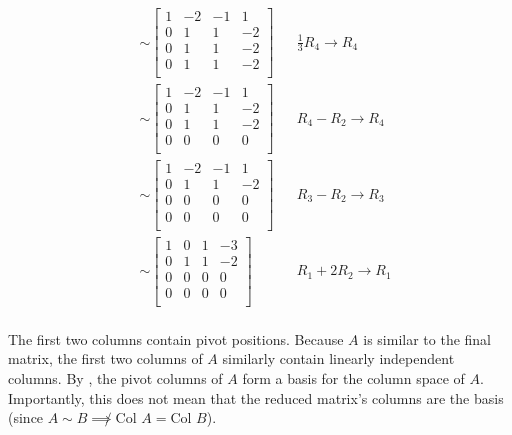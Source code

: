 \documentclass[10pt,letterpaper,final]{report}
\newcommand{\reason}[1]{&& \text{#1}}
\begin{document}
\begin{enumerate}[label=(\alph*)]
\begin{align*}
            & \sim \begin{bmatrix}
                     1 & -2 & -1 & 1  \\
                     0 & 1  & 1  & -2 \\
                     0 & 1  & 1  & -2 \\
                     0 & 1  & 1  & -2 \\
                   \end{bmatrix} \reason{$\frac{1}{3}R_4 \to R_4$}                 \\[1ex]
            & \sim \begin{bmatrix}
                     1 & -2 & -1 & 1  \\
                     0 & 1  & 1  & -2 \\
                     0 & 1  & 1  & -2 \\
                     0 & 0  & 0  & 0  \\
                   \end{bmatrix} \reason{$R_4 - R_2 \to R_4$}                      \\[1ex]
            & \sim \begin{bmatrix}
                     1 & -2 & -1 & 1  \\
                     0 & 1  & 1  & -2 \\
                     0 & 0  & 0  & 0  \\
                     0 & 0  & 0  & 0  \\
                   \end{bmatrix} \reason{$R_3 - R_2 \to R_3$}                      \\[1ex]
            & \sim \begin{bmatrix}
                     \boxed{1} & 0         & 1 & -3 \\
                     0         & \boxed{1} & 1 & -2 \\
                     0         & 0         & 0 & 0  \\
                     0         & 0         & 0 & 0  \\
                   \end{bmatrix} \reason{$R_1 + 2R_2 \to R_1$}                     \\[1ex]
        \end{align*}

        The first two columns contain pivot positions. Because $A$ is similar to the final matrix, the first two columns of $A$ similarly contain linearly independent columns. By \cite[Theorem 2.13, p. 159]{LayEtAl2020LinearAlgebraAndItsApplications}, the pivot columns of $A$ form a basis for the column space of $A$. Importantly, this does not mean that the reduced matrix's columns are the basis (since $A \sim B \not\implies \text{Col } A = \text{Col } B$).


\end{enumerate}
\end{document}
